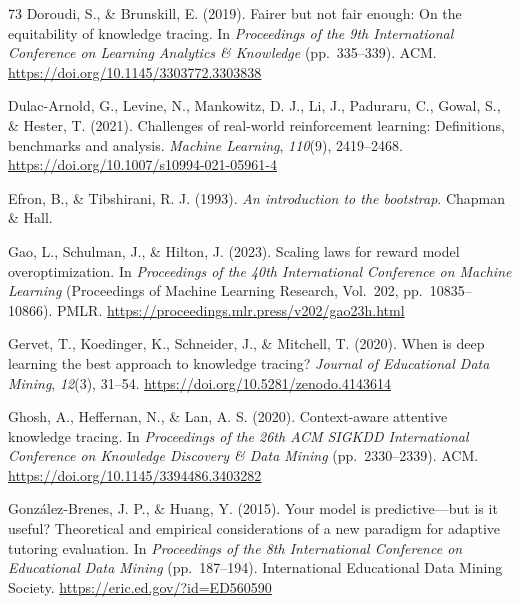 \documentclass[a4paper,preprint,12pt,authoryear]{elsarticle}
\begin{document}
\begin{thebibliography}{73}
Doroudi, S., \& Brunskill, E. (2019). Fairer but not fair enough: On the equitability of knowledge tracing. In \textit{Proceedings of the 9th International Conference on Learning Analytics \& Knowledge} (pp.~335--339). ACM. \url{https://doi.org/10.1145/3303772.3303838}

Dulac-Arnold, G., Levine, N., Mankowitz, D. J., Li, J., Paduraru, C., Gowal, S., \& Hester, T. (2021). Challenges of real-world reinforcement learning: Definitions, benchmarks and analysis. \textit{Machine Learning}, \textit{110}(9), 2419--2468. \url{https://doi.org/10.1007/s10994-021-05961-4}

Efron, B., \& Tibshirani, R. J. (1993). \textit{An introduction to the bootstrap}. Chapman \& Hall.

Gao, L., Schulman, J., \& Hilton, J. (2023). Scaling laws for reward model overoptimization. In \textit{Proceedings of the 40th International Conference on Machine Learning} (Proceedings of Machine Learning Research, Vol.~202, pp.~10835--10866). PMLR. \url{https://proceedings.mlr.press/v202/gao23h.html}

Gervet, T., Koedinger, K., Schneider, J., \& Mitchell, T. (2020). When is deep learning the best approach to knowledge tracing? \textit{Journal of Educational Data Mining}, \textit{12}(3), 31--54. \url{https://doi.org/10.5281/zenodo.4143614}

Ghosh, A., Heffernan, N., \& Lan, A. S. (2020). Context-aware attentive knowledge tracing. In \textit{Proceedings of the 26th ACM SIGKDD International Conference on Knowledge Discovery \& Data Mining} (pp.~2330--2339). ACM. \url{https://doi.org/10.1145/3394486.3403282}

Gonz{\'a}lez-Brenes, J. P., \& Huang, Y. (2015). Your model is predictive---but is it useful? Theoretical and empirical considerations of a new paradigm for adaptive tutoring evaluation. In \textit{Proceedings of the 8th International Conference on Educational Data Mining} (pp.~187--194). International Educational Data Mining Society. \url{https://eric.ed.gov/?id=ED560590}


\end{thebibliography}
\end{document}
